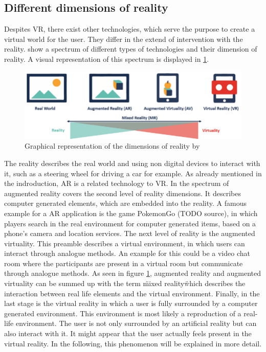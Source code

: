 \subsection{Different dimensions of reality}
Despites VR, there exist other technologies, which serve the purpose to create a virtual world for the user. They differ in the extend of intervention with the reality. \cite{Tham.2018} show a spectrum of different types of technologies and their dimension of reality. A visual representation of this spectrum is displayed in \ref{fig:spectrum}.\\
\begin{figure}[h!]
  \includegraphics[width=14cm]{kapitel/spectrum-of-reality.png}
  \centering
  \caption{Graphical representation of the dimensions of reality by 	  \cite{Lovreglio.2018}}
  \label{fig:spectrum}
\end{figure}

The reality describes the real world and using non digital devices to interact with it, such as a steering wheel for driving a car for example. As already mentioned in the indroduction, AR is a related technology to VR. In the spectrum of \cite{Tham.2018} augmented reality covers the second level of reality dimensions. It describes computer generated elements, which are embedded into the reality. A famous example for a AR application is the game PokemonGo (TODO source), in which players search in the real environment for computer generated items, based on a phone's camera and location services. The next level of reality is the augmented virtuality. This preamble describes a virtual environment, in which users can interact through analogue methods. An example for this could be a video chat room where the participants are present in a virtual room but communicate through analogue methods. As seen in figure \ref{fig:spectrum}, augmented reality and augmented virtuality can be summed up with the term \"mixed reality\" which describes the interaction between real life elements and the virtual environment. Finally, in the last stage is the virtual reality in which a user is fully surrounded by a computer generated environment. This environment is most likely a reproduction of a real-life environment. The user is not only surrounded by an artificial reality but can also interact with it. It might appear that the user actually feels present in the virtual reality. In the following, this phenomenon will be explained in more detail.

